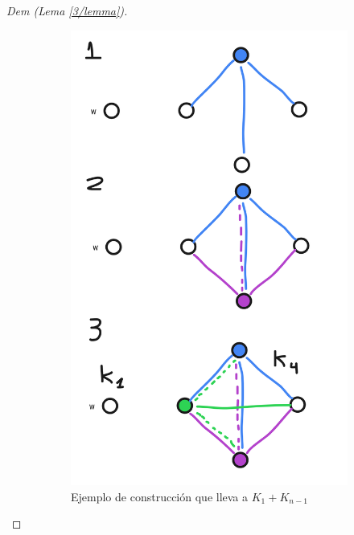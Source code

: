 \documentclass[12pt, a4paper]{report}
\theoremstyle{definition} %
\begin{document}
\begin{enumerate}[a)]
\begin{proof}[Dem (Lema \ref{3/lemma})]
        \begin{figure}[H]
            \centering
            \begin{subfigure}{0.4\textwidth}
                \centering
                \includegraphics[scale=0.15]{img/3-k1-kn-1.png}
                \caption{Ejemplo de construcción que lleva a $K_1 + K_{n-1}$}
            \end{subfigure}
            \qquad
            \begin{subfigure}{0.4\textwidth}
                \centering

\end{subfigure}
\end{figure}
\end{proof}
\end{enumerate}
\end{document}
